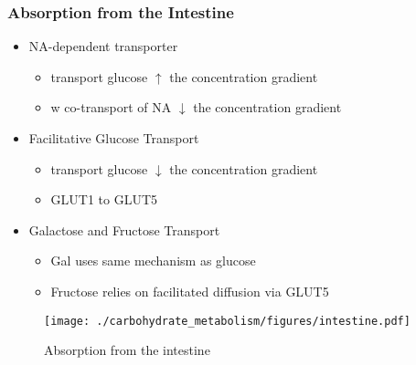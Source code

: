 \documentclass{scrartcl}
\begin{document}
\subsubsection{Absorption from the Intestine}
\label{sec:orga68c768}
\begin{itemize}
\item NA-dependent transporter
\begin{itemize}
\item transport glucose \(\uparrow\) the concentration gradient
\item w co-transport of NA \(\downarrow\) the concentration gradient
\end{itemize}
\item Facilitative Glucose Transport
\begin{itemize}
\item transport glucose \(\downarrow\) the concentration gradient
\item GLUT1 to GLUT5
\end{itemize}
\item Galactose and Fructose Transport
\begin{itemize}
\item Gal uses same mechanism as glucose
\item Fructose relies on facilitated diffusion via GLUT5
\end{itemize}
\end{itemize}

\begin{figure}[htbp]
\centering
\texttt{[image: ./carbohydrate\_metabolism/figures/intestine.pdf]}
\caption{\label{fig:orgeb29bff}
Absorption from the intestine}
\end{figure}
\end{document}
